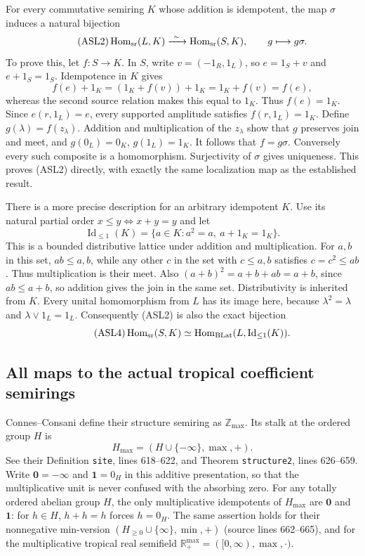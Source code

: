 For every commutative semiring $K$ whose addition is idempotent, the
map $\sigma$ induces a natural bijection
\begin{equation}\tag{ASL2}
 \operatorname{Hom}_{\rm sr}(L,K)
       \xrightarrow{\ \sim\ }
 \operatorname{Hom}_{\rm sr}(S,K),\qquad g\longmapsto g\sigma.
\end{equation}
To prove this, let $f:S\to K$. In $S$, write
$v=(-1_R,1_L)$, so $e=1_S+v$ and $e+1_S=1_S$.
Idempotence in $K$ gives
\[
 f(e)+1_K=(1_K+f(v))+1_K=1_K+f(v)=f(e),
\]
whereas the second source relation makes this equal to $1_K$.
Thus $f(e)=1_K$. Since $e(r,1_L)=e$, every supported amplitude
satisfies $f(r,1_L)=1_K$. Define $g(\lambda)=f(z_\lambda)$.
Addition and multiplication of the $z_\lambda$ show that $g$ preserves
join and meet, and $g(0_L)=0_K$, $g(1_L)=1_K$. It follows that
$f=g\sigma$. Conversely every such composite is a homomorphism.
Surjectivity of $\sigma$ gives uniqueness. This proves (ASL2) directly,
with exactly the same localization map as the established result.

There is a more precise description for an arbitrary idempotent $K$.
Use its natural partial order $x\le y\iff x+y=y$ and let
\begin{equation}\tag{ASL3}
 \operatorname{Id}_{\le1}(K)=\{a\in K:a^2=a,\ a+1_K=1_K\}.
\end{equation}
This is a bounded distributive lattice under addition and multiplication.
For $a,b$ in this set, $ab\le a,b$, while any other $c$ in the set
with $c\le a,b$ satisfies $c=c^2\le ab$. Thus multiplication is
their meet. Also $(a+b)^2=a+b+ab=a+b$, since $ab\le a+b$, so
addition gives the join in the same set. Distributivity is inherited
from $K$. Every unital homomorphism from $L$ has its image here,
because $\lambda^2=\lambda$ and $\lambda\vee1_L=1_L$.
Consequently (ASL2) is also the exact bijection
\begin{equation}\tag{ASL4}
 \operatorname{Hom}_{\rm sr}(S,K)
       \simeq\operatorname{Hom}_{\rm BLat}
                      (L,\operatorname{Id}_{\le1}(K)).
\end{equation}

\subsection{All maps to the actual tropical coefficient semirings}

Connes--Consani define their structure semiring as $\mathbb Z_{\max}$.
Its stalk at the ordered group $H$ is
\[
 H_{\max}=(H\cup\{-\infty\},\max,+).
\]
See their Definition
\texttt{site}, lines 618--622, and Theorem \texttt{structure2},
lines 626--659. Write $\mathbf0=-\infty$ and $\mathbf1=0_H$
in this additive presentation, so that the multiplicative unit is
never confused with the absorbing zero. For any totally ordered
abelian group $H$, the only multiplicative idempotents of $H_{\max}$
are $\mathbf0$ and $\mathbf1$: for $h\in H$, $h+h=h$ forces $h=0_H$.
The same assertion holds for their nonnegative min-version
$(H_{\ge0}\cup\{\infty\},\min,+)$ (source lines 662--665), and
for the multiplicative tropical real semifield
$\mathbb R_+^{\max}=([0,\infty),\max,\cdot)$.

